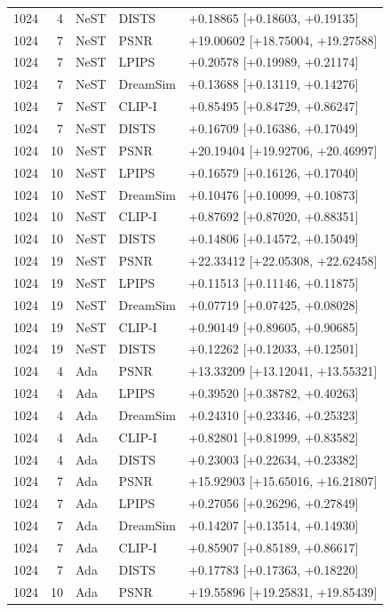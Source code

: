 \documentclass[10pt,letterpaper]{article}
\begin{document}
\begin{longtable}{@{}rrlll@{}}
1024 & 4 & NeST & DISTS & +0.18865 [+0.18603, +0.19135]\\
1024 & 7 & NeST & PSNR & +19.00602 [+18.75004, +19.27588]\\
1024 & 7 & NeST & LPIPS & +0.20578 [+0.19989, +0.21174]\\
1024 & 7 & NeST & DreamSim & +0.13688 [+0.13119, +0.14276]\\
1024 & 7 & NeST & CLIP-I & +0.85495 [+0.84729, +0.86247]\\
1024 & 7 & NeST & DISTS & +0.16709 [+0.16386, +0.17049]\\
1024 & 10 & NeST & PSNR & +20.19404 [+19.92706, +20.46997]\\
1024 & 10 & NeST & LPIPS & +0.16579 [+0.16126, +0.17040]\\
1024 & 10 & NeST & DreamSim & +0.10476 [+0.10099, +0.10873]\\
1024 & 10 & NeST & CLIP-I & +0.87692 [+0.87020, +0.88351]\\
1024 & 10 & NeST & DISTS & +0.14806 [+0.14572, +0.15049]\\
1024 & 19 & NeST & PSNR & +22.33412 [+22.05308, +22.62458]\\
1024 & 19 & NeST & LPIPS & +0.11513 [+0.11146, +0.11875]\\
1024 & 19 & NeST & DreamSim & +0.07719 [+0.07425, +0.08028]\\
1024 & 19 & NeST & CLIP-I & +0.90149 [+0.89605, +0.90685]\\
1024 & 19 & NeST & DISTS & +0.12262 [+0.12033, +0.12501]\\
1024 & 4 & Ada & PSNR & +13.33209 [+13.12041, +13.55321]\\
1024 & 4 & Ada & LPIPS & +0.39520 [+0.38782, +0.40263]\\
1024 & 4 & Ada & DreamSim & +0.24310 [+0.23346, +0.25323]\\
1024 & 4 & Ada & CLIP-I & +0.82801 [+0.81999, +0.83582]\\
1024 & 4 & Ada & DISTS & +0.23003 [+0.22634, +0.23382]\\
1024 & 7 & Ada & PSNR & +15.92903 [+15.65016, +16.21807]\\
1024 & 7 & Ada & LPIPS & +0.27056 [+0.26296, +0.27849]\\
1024 & 7 & Ada & DreamSim & +0.14207 [+0.13514, +0.14930]\\
1024 & 7 & Ada & CLIP-I & +0.85907 [+0.85189, +0.86617]\\
1024 & 7 & Ada & DISTS & +0.17783 [+0.17363, +0.18220]\\
1024 & 10 & Ada & PSNR & +19.55896 [+19.25831, +19.85439]\\

\end{longtable}
\end{document}
